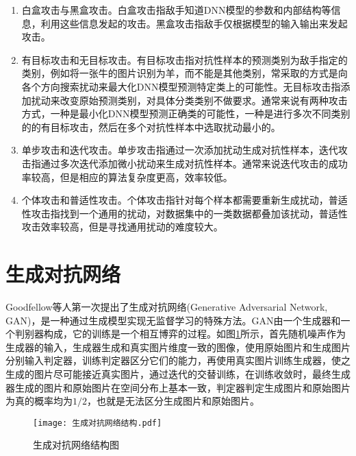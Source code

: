\begin{enumerate}
	\renewcommand{\labelenumi}{\theenumi)}
	\item 白盒攻击与黑盒攻击。白盒攻击指敌手知道DNN模型的参数和内部结构等信息，利用这些信息发起的攻击。黑盒攻击指敌手仅根据模型的输入输出来发起攻击。
	\item 有目标攻击和无目标攻击。有目标攻击指对抗性样本的预测类别为敌手指定的类别，例如将一张牛的图片识别为羊，而不能是其他类别，常采取的方式是向各个方向搜索扰动来最大化DNN模型预测特定类上的可能性。无目标攻击指添加扰动来改变原始预测类别，对具体分类类别不做要求。通常来说有两种攻击方式，一种是最小化DNN模型预测正确类的可能性，一种是进行多次不同类别的的有目标攻击，然后在多个对抗性样本中选取扰动最小的。
	\item 单步攻击和迭代攻击。单步攻击指通过一次添加扰动生成对抗性样本，迭代攻击指通过多次迭代添加微小扰动来生成对抗性样本。通常来说迭代攻击的成功率较高，但是相应的算法复杂度更高，效率较低。
	\item 个体攻击和普适性攻击。个体攻击指针对每个样本都需要重新生成扰动，普适性攻击指找到一个通用的扰动，对数据集中的一类数据都叠加该扰动，普适性攻击效率较高，但是寻找通用扰动的难度较大。
\end{enumerate}

\section{生成对抗网络}

Goodfellow等人\cite{goodfellow2014generative}第一次提出了生成对抗网络(Generative Adversarial Network, GAN)，是一种通过生成模型实现无监督学习的特殊方法。GAN由一个生成器和一个判别器构成，它的训练是一个相互博弈的过程。如图\ref{生成对抗网络结构图}所示，首先随机噪声作为生成器的输入，生成器生成和真实图片维度一致的图像，使用原始图片和生成图片分别输入判定器，训练判定器区分它们的能力，再使用真实图片训练生成器，使之生成的图片尽可能接近真实图片，通过迭代的交替训练，在训练收敛时，最终生成器生成的图片和原始图片在空间分布上基本一致，判定器判定生成图片和原始图片为真的概率均为$1/2$，也就是无法区分生成图片和原始图片。

\begin{figure}[htbp]%
	\centering
	\texttt{[image: 生成对抗网络结构.pdf]}
	\setlength{\abovecaptionskip}{5mm} %
	\caption{生成对抗网络结构图}
	\label{生成对抗网络结构图}
\end {figure}

